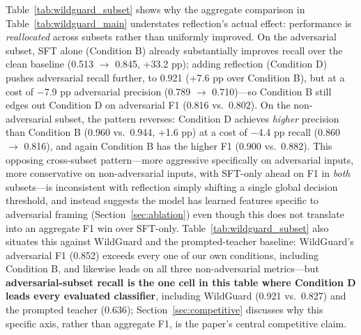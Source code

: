 \documentclass[Superintelligence,article,submit,pdftex,moreauthors]{Definitions/mdpi}
\begin{document}
Table~\ref{tab:wildguard_subset} shows why the aggregate comparison in Table~\ref{tab:wildguard_main} understates reflection's actual effect: performance is \emph{reallocated} across subsets rather than uniformly improved. On the adversarial subset, SFT alone (Condition B) already substantially improves recall over the clean baseline (0.513 $\to$ 0.845, +33.2 pp); adding reflection (Condition D) pushes adversarial recall further, to 0.921 (+7.6 pp over Condition B), but at a cost of $-$7.9 pp adversarial precision (0.789 $\to$ 0.710)---so Condition B still edges out Condition D on adversarial F1 (0.816 vs.\ 0.802). On the non-adversarial subset, the pattern reverses: Condition D achieves \emph{higher} precision than Condition B (0.960 vs.\ 0.944, +1.6 pp) at a cost of $-$4.4 pp recall (0.860 $\to$ 0.816), and again Condition B has the higher F1 (0.900 vs.\ 0.882). This opposing cross-subset pattern---more aggressive specifically on adversarial inputs, more conservative on non-adversarial inputs, with SFT-only ahead on F1 in \emph{both} subsets---is inconsistent with reflection simply shifting a single global decision threshold, and instead suggests the model has learned features specific to adversarial framing (Section~\ref{sec:ablation}) even though this does not translate into an aggregate F1 win over SFT-only. Table~\ref{tab:wildguard_subset} also situates this against WildGuard and the prompted-teacher baseline: WildGuard's adversarial F1 (0.852) exceeds every one of our own conditions, including Condition B, and likewise leads on all three non-adversarial metrics---but \textbf{adversarial-subset recall is the one cell in this table where Condition D leads every evaluated classifier}, including WildGuard (0.921 vs.\ 0.827) and the prompted teacher (0.636); Section~\ref{sec:competitive} discusses why this specific axis, rather than aggregate F1, is the paper's central competitive claim.
\end{document}
